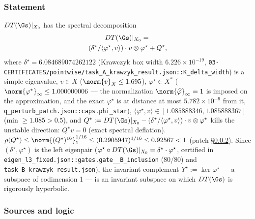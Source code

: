 \subsubsection{Statement}
\label{sec:5.2.1}

\begin{theorem}[Hyp-5-W6-L3]
$DT(\Gs)|_{X_{0}}$ has the spectral decomposition
\begin{multline*}
DT(\Gs)|_{X_{0}} = {}\\
(\delta^{\star} / \langle \varphi^{\star}, v\rangle) \cdot v
\otimes \varphi^{\star} + Q^{\star} ,
\end{multline*}
where $\delta^{\star} = 6.084689074262122$ (Krawczyk box width
$6.226\times 10^{-19}$,
\texttt{03-\allowbreak CERTIFICATES/\allowbreak pointwise/\allowbreak task\_\allowbreak A\_\allowbreak krawzyk\_\allowbreak result.json\allowbreak ::\allowbreak K\_\allowbreak delta\_\allowbreak width})
is a simple eigenvalue, $v \in X$ ($\norm{v}_X \le 1.695$), $\varphi^{\star} \in
X^{*}$ ($\norm{\varphi^{\star}}_\infty \le 1.000000006$ --- the normalization
$\norm{\widehat{\varphi}}_\infty = 1$ is imposed on the approximation, and the
exact $\varphi^{\star}$ is at distance at most $5.782\times 10^{-9}$ from it,
\texttt{q\_\allowbreak perturb\_\allowbreak patch.json::\allowbreak caps.phi\_\allowbreak star}), $\langle \varphi^{\star},
v\rangle \in [1.085888346, 1.085888367]$ (min $\ge 1.085 > 0.5$), and
$Q^{\star} := DT(\Gs)|_{X_{0}} - (\delta^{\star}/\langle \varphi^{\star},v\rangle)
\cdot v\otimes \varphi^{\star}$ kills the unstable direction: $Q^{\star} v = 0$
(exact spectral deflation).
$\rho(Q^{\star}) \le \norm{(Q^{\star})^{16}}_1^{1/16} \le (0.2905947)^{1/16} \le
0.92567 < 1$ (patch \S\ref{sec:5.2.2}). Since $(\delta^{\star}, \varphi^{\star})$ is the left
eigenpair ($\varphi^{\star}\circ DT(\Gs)|_{X_{0}} = \delta^{\star}\cdot
\varphi^{\star}$, certified in \texttt{eigen\_\allowbreak l3\_\allowbreak fixed.json\allowbreak ::\allowbreak gates.\allowbreak gate\_\_\allowbreak B\_\allowbreak inclusion}
(80/80) and \texttt{task\_\allowbreak B\_\allowbreak krawzyk\_\allowbreak result.json}), the invariant complement
$Y^{\star} := \ker \varphi^{\star}$ --- a subspace of codimension 1 --- is an
invariant subspace on which $DT(\Gs)$ is rigorously hyperbolic.
\end{theorem}

\subsubsection{Sources and logic}
\label{sec:5.2.2}

